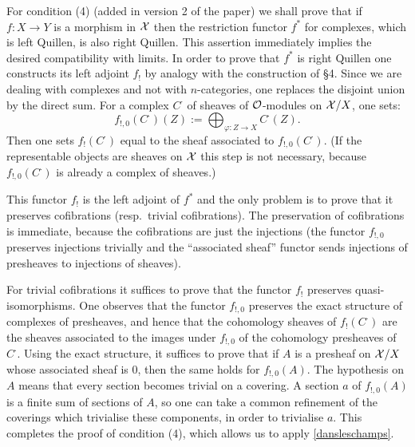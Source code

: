 
For condition (4) (added in version 2 of the paper) we shall prove
that if $f: X\rightarrow Y$ is a morphism in ${\cal X} $ then the restriction
functor $f^{\ast}$ for complexes, which is left Quillen, is also right
Quillen. This assertion immediately implies the desired compatibility
with limits. In order to prove that $f^{\ast}$
is right Quillen one constructs its left adjoint $f_{!}$ by
analogy with the construction of \S4. Since we are dealing with complexes and not
with $n$-categories, one replaces the disjoint union by the direct sum.
For a complex $C^{\cdot}$ of sheaves of ${\cal O}$-modules
on ${\cal X} /X$, one sets:
$$
f_{!, 0}(C^{\cdot})(Z) := \bigoplus _{\varphi : Z\rightarrow X}
C^{\cdot} (Z).
$$
Then one sets $f_!(C^{\cdot})$ equal to the sheaf associated to
$f_{!,0}(C^{\cdot})$. (If the representable objects are sheaves
on ${\cal X}$ this step is not necessary, because $f_{!,0}(C^{\cdot})$
is already a complex of sheaves.)

This functor $f_!$ is the left adjoint of $f^{\ast}$ and
the only problem is
to prove that it preserves cofibrations (resp.\ trivial cofibrations).
The preservation of cofibrations is immediate, because the cofibrations are
just
the injections (the functor $f_{!,0}$ preserves injections trivially
and the ``associated sheaf'' functor sends injections of presheaves
to injections of sheaves).

For trivial cofibrations it suffices to
prove that the functor $f_{!}$ preserves quasi-isomorphisms.
One observes that the functor
$f_{!,0}$ preserves the exact structure of complexes of presheaves,
and hence
that the cohomology sheaves of $f_{!}(C^{\cdot})$ are the sheaves
associated to the images under $f_{!,0}$ of the cohomology presheaves of
$C^{\cdot}$. Using the exact structure, it suffices to prove that if $A$
is a presheaf on ${\cal X} /X$ whose associated sheaf is $0$,
then the same holds for $f_{!,0}(A)$. The hypothesis on $A$ means
that every section becomes trivial on a covering. A section $a$ of
$f_{!,0}(A)$ is a finite sum of sections of $A$, so one can take
a common refinement of the coverings which trivialise these components,
in order to trivialise $a$. This completes the proof of condition (4),
which allows us to apply \ref{dansleschamps}.



